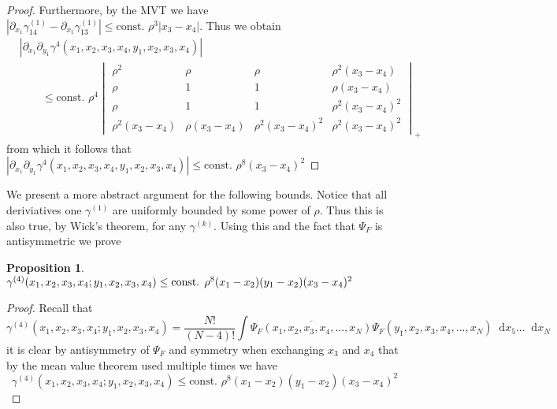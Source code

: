\documentclass[a4paper,11pt]{article}
\newcommand{\abs}[1]{\left\lvert #1 \right\rvert}
\newcommand*\diff{\mathop{}\!\mathrm{d}}
\newtheorem{proposition}{Proposition}
\numberwithin{equation}{section}
\begin{document}
\begin{proof}
			Furthermore, by the MVT we have $ \abs{\partial_{x_1}\gamma^{(1)}_{14}-\partial_{x_1}\gamma^{(1)}_{13}}\leq \text{const. }\rho^3\abs{x_3-x_4} $. Thus we obtain\begin{equation}
			\begin{aligned}
			&\abs{\partial_{x_1}\partial_{y_1}\gamma^{4}(x_1,x_2,x_3,x_4,y_1,x_2,x_3,x_4)}\\
			&\qquad\leq\text{const. }\rho^4\begin{vmatrix}
			\rho^2&\rho&\rho&\rho^2(x_3-x_4)\\
			\rho&1&1&\rho(x_3-x_4)\\
			\rho&1&1&\rho^2(x_3-x_4)^2\\
			\rho^2(x_3-x_4)&\rho(x_3-x_4)&\rho^2(x_3-x_4)^2&\rho^2(x_3-x_4)^2
			\end{vmatrix}_{+}
			\end{aligned}
			\end{equation}
			from which it follows that $ \abs{\partial_{x_1}\partial_{y_1}\gamma^{4}(x_1,x_2,x_3,x_4,y_1,x_2,x_3,x_4)}\leq \text{const. }\rho^8(x_3-x_4)^2 $
		\end{proof}
		We present a more abstract argument for the following bounds. Notice that all deriviatives one $ \gamma^{(1)} $ are uniformly bounded by some power of $ \rho $. Thus this is also true, by Wick's theorem, for any $ \gamma^{(k)} $. Using this and the fact that $ \Psi_F $ is antisymmetric we prove\begin{proposition}
			$ \gamma^{(4)}(x_1,x_2,x_3,x_4;y_1,x_2,x_3,x_4)\leq \textnormal{const. }\rho^8(x_1-x_2)(y_1-x_2)(x_3-x_4)^2 $
		\end{proposition}
		\begin{proof}
			Recall that \begin{equation}
			\gamma^{(4)}(x_1,x_2,x_3,x_4;y_1,x_2,x_3,x_4)=\frac{N!}{(N-4)!}\int\overline{\Psi_F(x_1,x_2,x_3,x_4,...,x_N)}\Psi_F(y_1,x_2,x_3,x_4,...,x_N)\diff x_5...\diff x_N 
			\end{equation}
			it is clear by antisymmetry of $ \Psi_F $ and symmetry when exchanging $ x_3 $ and $x_4 $ that by the mean value theorem used multiple times we have \begin{equation}
			\gamma^{(4)}(x_1,x_2,x_3,x_4;y_1,x_2,x_3,x_4)\leq\text{const. }\rho^8(x_1-x_2)(y_1-x_2)(x_3-x_4)^2
			\end{equation}
		\end{proof}
\end{document}

